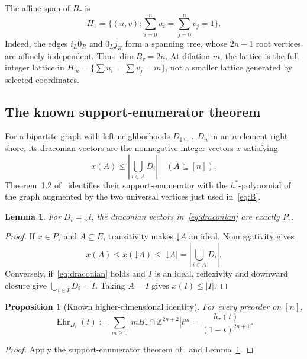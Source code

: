 \documentclass[11pt]{article}
\numberwithin{equation}{section}
\newtheorem{lemma}[theorem]{Lemma}
\newtheorem{proposition}[theorem]{Proposition}
\theoremstyle{definition}
\newcommand{\Z}{\mathbb Z}
\newcommand{\Pt}{P_\tau}
\newcommand{\Ehr}{\operatorname{Ehr}}
\newcommand{\down}{\mathord\downarrow}
\begin{document}
The affine span of $B_\tau$ is
\begin{equation}
 H_1=\{(u,v):\textstyle\sum_{i=0}^{n}u_i
                  =\sum_{j=0}^{n}v_j=1\}.\label{eq:affine}
\end{equation}
Indeed, the edges $i_L0_R$ and $0_Lj_R$ form a spanning tree, whose $2n+1$
root vertices are affinely independent. Thus $\dim B_\tau=2n$. At dilation
$m$, the lattice is the full integer lattice in
$H_m=\{\sum u_i=\sum v_j=m\}$, not a smaller lattice generated by selected
coordinates.

\subsection{The known support-enumerator theorem}

For a bipartite graph with left neighborhoods $D_1,\ldots,D_n$ in an
$n$-element right shore, its draconian vectors are the nonnegative integer
vectors $x$ satisfying
\begin{equation}
 x(A)\leq\left|\bigcup_{i\in A}D_i\right|
       \quad(A\subseteq[n]).\label{eq:draconian}
\end{equation}
Theorem~1.2 of~\cite{DHLTW} identifies their support-enumerator with the
$h^*$-polynomial of the graph augmented by the two universal vertices just
used in~\eqref{eq:B}.

\begin{lemma}\label{lem:draconian}
For $D_i=\down i$, the draconian vectors in~\eqref{eq:draconian} are exactly
$\Pt$.
\end{lemma}
\begin{proof}
If $x\in\Pt$ and $A\subseteq E$, transitivity makes $\down A$ an ideal.
Nonnegativity gives
\[
 x(A)\leq x(\down A)\leq|\down A|
        =\left|\bigcup_{i\in A}D_i\right|.
\]
Conversely, if~\eqref{eq:draconian} holds and $I$ is an ideal, reflexivity and
downward closure give $\bigcup_{i\in I}D_i=I$. Taking $A=I$ gives
$x(I)\leq|I|$.
\end{proof}

\begin{proposition}[Known higher-dimensional identity]\label{prop:known}
For every preorder on $[n]$,
\begin{equation}
 \Ehr_{B_\tau}(t):=\sum_{m\geq0}|mB_\tau\cap\Z^{2n+2}|t^m
       =\frac{h_\tau(t)}{(1-t)^{2n+1}}.\label{eq:known}
\end{equation}
\end{proposition}
\begin{proof}
Apply the support-enumerator theorem of~\cite{DHLTW} and
Lemma~\ref{lem:draconian}.
\end{proof}
\end{document}
